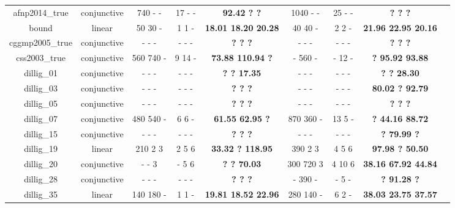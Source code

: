\begin{table}[t]
\begin{tabular}{l c | c c c | c c c | c }
\multicolumn{1}{|c|}{afnp2014\_true}	&conjunctive		&740 - - &17 - -&\textbf{92.42 ? ?}			&1040 - - &25 - -  &\textbf{? ? ?}					&\multicolumn{1}{|c|}{\cmark} \\
\multicolumn{1}{|c|}{bound}				&linear 			&50 30 - &1 1 -&\textbf{18.01 18.20 20.28}	&40 40 - &2 2 -  &\textbf{21.96 22.95 20.16}		&\multicolumn{1}{|c|}{\cmark} \\
\multicolumn{1}{|c|}{cggmp2005\_true}	&conjunctive		&- - - &- - -&\textbf{? ? ?}		  		&- - - &- - -  &\textbf{? ? ?}					&\multicolumn{1}{|c|}{\cmark} \\
\multicolumn{1}{|c|}{css2003\_true}		&conjunctive		&560 740 - &9 14 -&\textbf{73.88 110.94 ?}		&- 560 - &- 12 -  &\textbf{? 95.92 93.88}			&\multicolumn{1}{|c|}{\cmark} \\

\multicolumn{1}{|c|}{dillig\_01}		&conjunctive		&- - - &- - -&\textbf{? ? 17.35}		&- - - &- - -  &\textbf{? ? 28.30}			&\multicolumn{1}{|c|}{\cmark} \\
\multicolumn{1}{|c|}{dillig\_03}		&conjunctive		&- - - &- - -&\textbf{? ? ?}				&- - - &- - -  &\textbf{80.02 ? 92.79}			&\multicolumn{1}{|c|}{\cmark} \\
\multicolumn{1}{|c|}{dillig\_05}		&conjunctive		&- - - &- - -&\textbf{? ? ?}				&- - - &- - -  &\textbf{? ? ?}					&\multicolumn{1}{|c|}{\cmark} \\
\multicolumn{1}{|c|}{dillig\_07}		&conjunctive		&480 540 - &6 6 -&\textbf{61.55 62.95 ?}		&870 360 - &13 5 -  &\textbf{? 44.16 88.72}			&\multicolumn{1}{|c|}{\cmark} \\
\multicolumn{1}{|c|}{dillig\_15}		&conjunctive		&- - - &- - -&\textbf{? ? ?}				&- - - &- - -  &\textbf{? 79.99 ?}				&\multicolumn{1}{|c|}{\cmark} \\
\multicolumn{1}{|c|}{dillig\_19}		&linear 			&210 2 3 &2 5 6 &\textbf{33.32 ? 118.95}	&390 2 3 &4 5 6   &\textbf{97.98 ? 50.50}			&\multicolumn{1}{|c|}{\cmark} \\
\multicolumn{1}{|c|}{dillig\_20}		&conjunctive		&- - 3 &- 5 6 &\textbf{? ? 70.03}			&300 720 3 &4 10 6   &\textbf{38.16 67.92 44.84}		&\multicolumn{1}{|c|}{\cmark} \\
\multicolumn{1}{|c|}{dillig\_28}		&conjunctive		&- - - &- - -&\textbf{? ? ?}				&- 390 - &- 5 -  &\textbf{? 91.28 ?}				&\multicolumn{1}{|c|}{\cmark} \\
\multicolumn{1}{|c|}{dillig\_35}		&linear 			&140 180 - &1 1 -&\textbf{19.81 18.52 22.96}	&280 140 - &6 2 -  &\textbf{38.03 23.75 37.57}		&\multicolumn{1}{|c|}{\cmark} \\


\end{tabular}
\end{table}
